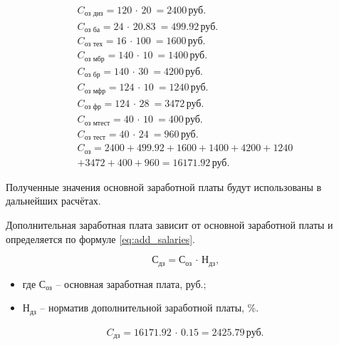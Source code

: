 \begin{gather*}
  C_{\text{оз диз}}   = 120\,\cdot\,20\ = 2400\,\text{руб.}\\
  C_{\text{оз ба}}    = 24\,\cdot\,20.83\ = 499.92\,\text{руб.}\\
  C_{\text{оз тех}}   = 16\,\cdot\,100\ = 1600\,\text{руб.}\\
  C_{\text{оз мбр}}   = 140\,\cdot\,10\ = 1400\,\text{руб.}\\
  C_{\text{оз бр}}    = 140\,\cdot\,30\ = 4200\,\text{руб.}\\
  C_{\text{оз мфр}}   = 124\,\cdot\,10\ = 1240\,\text{руб.}\\
  C_{\text{оз фр}}    = 124\,\cdot\,28\ = 3472\,\text{руб.}\\
  C_{\text{оз мтест}} = 40\,\cdot\,10\ = 400\,\text{руб.}\\
  C_{\text{оз тест}}  = 40\,\cdot\,24\ = 960\,\text{руб.}\\
  C_{\text{оз}}       = 2400 + 499.92 + 1600 + 1400 + 4200 + 1240 \\+ 3472 + 400 + 960 = 16171.92\,\text{руб.}
\end{gather*}

Полученные значения основной заработной платы будут использованы в дальнейших расчётах.


Дополнительная заработная плата зависит от основной заработной платы и определяется по формуле \ref{eq:add_salaries}.

\noindent
\begin{minipage}{1\linewidth}
\begin{equation}\label{eq:add_salaries}
  \text{С}_\text{дз} = \text{С}_\text{оз}\,\cdot\,\text{Н}_\text{дз}\text{,}
\end{equation}
\begin{itemize}[nosep, leftmargin=0pt, labelindent=0pt, itemsep=0pt, parsep=0pt]
  \item[] где $\text{С}_\text{оз}$ -- основная заработная плата, руб.;
  \item[] \hspace*{12.5mm}$\text{Н}_\text{дз}$ -- норматив дополнительной заработной платы, \%.
\end{itemize}
\end{minipage}

\begin{gather*}
  C_{\text{дз}} = 16171.92\,\cdot\,0.15 = 2425.79\,\text{руб.}
\end{gather*}

